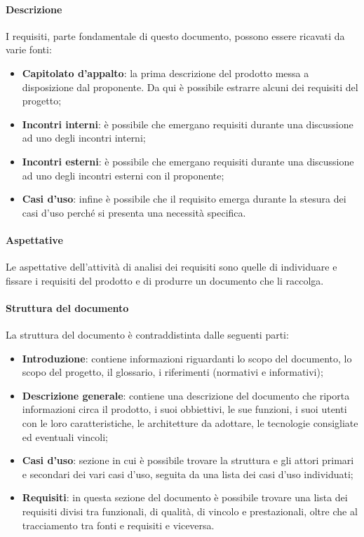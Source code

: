 \paragraph{Descrizione}

I requisiti, parte fondamentale di questo documento, possono essere ricavati da varie fonti:
\begin{itemize}
    \item \textbf{Capitolato d'appalto}: la prima descrizione del prodotto messa a disposizione dal proponente. Da qui 
    è possibile estrarre alcuni dei requisiti del progetto;
    \item \textbf{Incontri interni}: è possibile che emergano requisiti durante una discussione ad uno degli incontri interni;
    \item \textbf{Incontri esterni}: è possibile che emergano requisiti durante una discussione ad uno degli incontri esterni con il proponente;
    \item \textbf{Casi d'uso}: infine è possibile che il requisito emerga durante la stesura dei casi d'uso perché si 
    presenta una necessità specifica.
\end{itemize}

\paragraph{Aspettative}

Le aspettative dell'attività di analisi dei requisiti sono quelle di individuare e fissare i requisiti del prodotto e di 
produrre un documento che li raccolga.

\paragraph{Struttura del documento}

La struttura del documento è contraddistinta dalle seguenti parti:
\begin{itemize}
    \item \textbf{Introduzione}: contiene informazioni riguardanti lo scopo del documento, lo scopo del progetto, il 
    glossario, i riferimenti (normativi e informativi);
    \item \textbf{Descrizione generale}: contiene una descrizione del documento che riporta informazioni circa il 
    prodotto, i suoi obbiettivi, le sue funzioni, i suoi utenti con le loro caratteristiche, le architetture da adottare, 
    le tecnologie consigliate ed eventuali vincoli;
    \item \textbf{Casi d'uso}: sezione in cui è possibile trovare la struttura e gli attori primari e secondari dei vari 
    casi d'uso, seguita da una lista dei casi d'uso individuati;
    \item \textbf{Requisiti}: in questa sezione del documento è possibile trovare una lista dei requisiti divisi tra 
    funzionali, di qualità, di vincolo e prestazionali, oltre che al tracciamento tra fonti e requisiti e viceversa.
\end{itemize}

